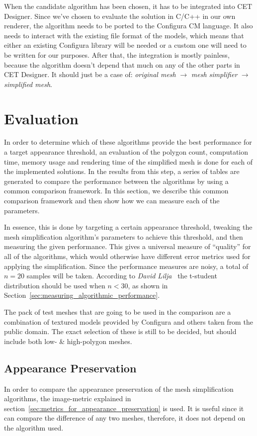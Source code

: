         When the candidate algorithm has been chosen, it has to be integrated into CET Designer. Since we've chosen to evaluate the solution in C/C++ in our own renderer, the algorithm needs to be ported to the Configura CM language. It also needs to interact with the existing file format of the models, which means that either an existing Configura library will be needed or a custom one will need to be written for our purposes. After that, the integration is mostly painless, because the algorithm doesn't depend that much on any of the other parts in CET Designer. It should just be a case of: \emph{original mesh} $\rightarrow$ \emph{mesh simplifier} $\rightarrow$ \emph{simplified mesh}.

    \section{Evaluation} \label{sec:evaluation}

        In order to determine which of these algorithms provide the best performance for a target appearance threshold, an evaluation of the polygon count, computation time, memory usage and rendering time of the simplified mesh is done for each of the implemented solutions. In the results from this step, a series of tables are generated to compare the performance between the algorithms by using a common comparison framework. In this section, we describe this common comparison framework and then show how we can measure each of the parameters.

        In essence, this is done by targeting a certain appearance threshold, tweaking the mesh simplification algorithm's parameters to achieve this threshold, and then measuring the given performance. This gives a universal measure of ``quality'' for all of the algorithms, which would otherwise have different error metrics used for applying the simplification. Since the performance measures are noisy, a total of \(n=20\) samples will be taken. According to \emph{David Lilja}~\cite[p.~50]{lilja2005measuring} the t-student distribution should be used when \(n < 30\), as shown in Section~\ref{sec:measuring_algorithmic_performance}.

        The pack of test meshes that are going to be used in the comparison are a combination of textured models provided by Configura and others taken from the public domain. The exact selection of these is still to be decided, but should include both low- \& high-polygon meshes.

        \subsection{Appearance Preservation} \label{sec:appearance_preservation}
        In order to compare the appearance preservation of the mesh simplification algorithms, the image-metric explained in section~\ref{sec:metrics_for_appearance_preservation} is used. It is useful since it can compare the difference of any two meshes, therefore, it does not depend on the algorithm used.

